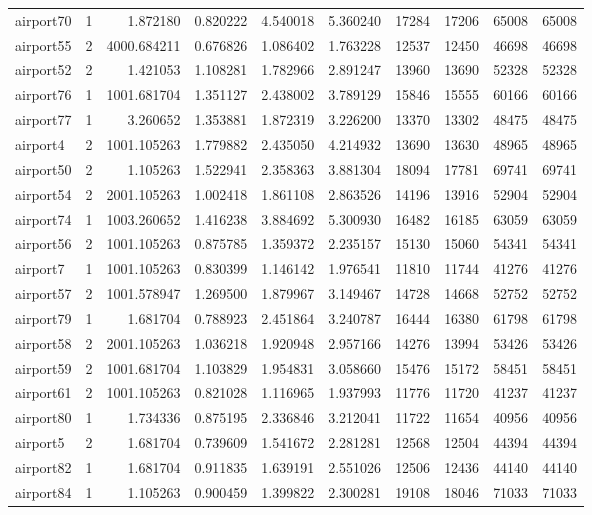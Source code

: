 \begin{longtable}{|l|r|r|r|r|r|r|r|r|r|}
airport70 & 1 & 1.872180 & 0.820222 & 4.540018 & 5.360240 & 17284 & 17206 & 65008 & 65008 \\
airport55 & 2 & 4000.684211 & 0.676826 & 1.086402 & 1.763228 & 12537 & 12450 & 46698 & 46698 \\
airport52 & 2 & 1.421053 & 1.108281 & 1.782966 & 2.891247 & 13960 & 13690 & 52328 & 52328 \\
airport76 & 1 & 1001.681704 & 1.351127 & 2.438002 & 3.789129 & 15846 & 15555 & 60166 & 60166 \\
airport77 & 1 & 3.260652 & 1.353881 & 1.872319 & 3.226200 & 13370 & 13302 & 48475 & 48475 \\
airport4 & 2 & 1001.105263 & 1.779882 & 2.435050 & 4.214932 & 13690 & 13630 & 48965 & 48965 \\
airport50 & 2 & 1.105263 & 1.522941 & 2.358363 & 3.881304 & 18094 & 17781 & 69741 & 69741 \\
airport54 & 2 & 2001.105263 & 1.002418 & 1.861108 & 2.863526 & 14196 & 13916 & 52904 & 52904 \\
airport74 & 1 & 1003.260652 & 1.416238 & 3.884692 & 5.300930 & 16482 & 16185 & 63059 & 63059 \\
airport56 & 2 & 1001.105263 & 0.875785 & 1.359372 & 2.235157 & 15130 & 15060 & 54341 & 54341 \\
airport7 & 1 & 1001.105263 & 0.830399 & 1.146142 & 1.976541 & 11810 & 11744 & 41276 & 41276 \\
airport57 & 2 & 1001.578947 & 1.269500 & 1.879967 & 3.149467 & 14728 & 14668 & 52752 & 52752 \\
airport79 & 1 & 1.681704 & 0.788923 & 2.451864 & 3.240787 & 16444 & 16380 & 61798 & 61798 \\
airport58 & 2 & 2001.105263 & 1.036218 & 1.920948 & 2.957166 & 14276 & 13994 & 53426 & 53426 \\
airport59 & 2 & 1001.681704 & 1.103829 & 1.954831 & 3.058660 & 15476 & 15172 & 58451 & 58451 \\
airport61 & 2 & 1001.105263 & 0.821028 & 1.116965 & 1.937993 & 11776 & 11720 & 41237 & 41237 \\
airport80 & 1 & 1.734336 & 0.875195 & 2.336846 & 3.212041 & 11722 & 11654 & 40956 & 40956 \\
airport5 & 2 & 1.681704 & 0.739609 & 1.541672 & 2.281281 & 12568 & 12504 & 44394 & 44394 \\
airport82 & 1 & 1.681704 & 0.911835 & 1.639191 & 2.551026 & 12506 & 12436 & 44140 & 44140 \\
airport84 & 1 & 1.105263 & 0.900459 & 1.399822 & 2.300281 & 19108 & 18046 & 71033 & 71033 \\

\end{longtable}
